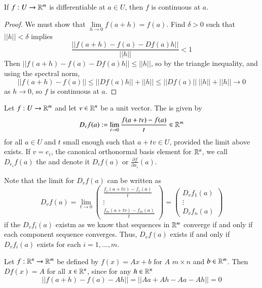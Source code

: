 \begin{prop}
    If $f:U\rightarrow \mathbb R^m$ is differentiable at $a \in U$, then $f$ is continuous at $a$.
\end{prop}
\begin{proof}
    We must show that $\lim\limits_{h\rightarrow 0}f(a+h) = f(a)$. Find $\delta > 0$ such that $||h|| < \delta$ implies $$\frac{||f(a+h)-f(a)-Df(a)h||}{||h||} < 1$$ Then $||f(a+h) - f(a) - Df(a)h|| \leq ||h||$, so by the triangle inequality, and using the spectral norm, $$||f(a+h) - f(a)|| \leq ||Df(a)h|| + ||h|| \leq ||Df(a)||\;||h|| + ||h||\rightarrow 0$$ as $h\rightarrow 0$, so $f$ is continuous at $a$.
\end{proof}

\begin{defn}
    Let $f:U\rightarrow \mathbb R^m$ and let $v \in \mathbb R^n$ be a unit vector. The  is given by $$D_vf(a) := \lim\limits_{t\rightarrow 0}\frac{f(a+tv)-f(a)}{t} \in \mathbb R^m$$ for all $a \in U$ and $t$ small enough such that $a+tv \in U$, provided the limit above exists. If $v = e_i$, the canonical orthonormal basis element for $\mathbb R^n$, we call $D_{e_i}f(a)$ the  and denote it $D_if(a)$ or $\frac{\partial f}{\partial x_i}(a)$.
\end{defn}

Note that the limit for $D_vf(a)$ can be written as \begin{equation*}
    D_vf(a) = \lim\limits_{t\rightarrow 0}\begin{pmatrix} \frac{f_1(a+tv)-f_1(a)}{t} \\ \vdots \\ \frac{f_m(a+tv) - f_m(a)}{t} \end{pmatrix} = \begin{pmatrix} D_vf_1(a) \\ \vdots \\ D_vf_n(a)\end{pmatrix}
\end{equation*}
if the $D_vf_i(a)$ existm as we know that sequences in $\mathbb R^m$ converge if and only if each component sequence converges. Thus, $D_vf(a)$ exists if and only if $D_vf_i(a)$ exists for each $i = 1,...,m$.

\begin{eg}
    Let $f:\mathbb R^n\rightarrow \mathbb R^m$ be defined by $f(x) = Ax+b$ for $A$ $m\times n$ and $b \in \mathbb R^m$. Then $Df(x) = A$ for all $x \in \mathbb R^n$, since for any $h \in \mathbb R^n$ $$||f(a+h) - f(a) - Ah|| = ||Aa+Ah-Aa-Ah|| = 0$$
\end{eg}


